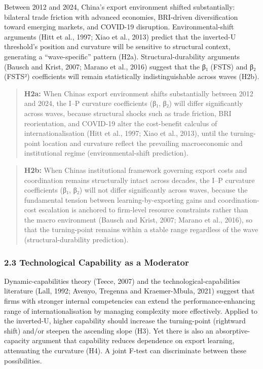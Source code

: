 \documentclass[12pt,a4paper]{article}
\begin{document}
Between 2012 and 2024, China's export environment shifted substantially:
bilateral trade friction with advanced economies, BRI-driven
diversification toward emerging markets, and COVID-19 disruption.
Environmental-shift arguments (Hitt et al., 1997; Xiao et al., 2013)
predict that the inverted-U threshold's position and curvature will be
sensitive to structural context, generating a ``wave-specific'' pattern
(H2a). Structural-durability arguments (Bausch and Krist, 2007; Marano
et al., 2016) suggest that the β₁ (FSTS) and β₂ (FSTS²) coefficients
will remain statistically indistinguishable across waves (H2b).

\begin{quote}
\textbf{H2a:} When China\textquotesingle s export environment shifts
substantially between 2012 and 2024, the I--P curvature coefficients
(β₁, β₂) will differ significantly across waves, because structural
shocks such as trade friction, BRI reorientation, and COVID-19 alter the
cost-benefit calculus of internationalisation (Hitt et al., 1997; Xiao
et al., 2013), until the turning-point location and curvature reflect
the prevailing macroeconomic and institutional regime
(environmental-shift prediction).
\end{quote}

\begin{quote}
\textbf{H2b:} When China\textquotesingle s institutional framework
governing export costs and coordination remains structurally intact
across decades, the I--P curvature coefficients (β₁, β₂) will not differ
significantly across waves, because the fundamental tension between
learning-by-exporting gains and coordination-cost escalation is anchored
to firm-level resource constraints rather than the macro environment
(Bausch and Krist, 2007; Marano et al., 2016), so that the turning-point
remains within a stable range regardless of the wave
(structural-durability prediction).
\end{quote}

\hypertarget{23-technological-capability-as-a-moderator}{%
\subsubsection{2.3 Technological Capability as a
Moderator}\label{23-technological-capability-as-a-moderator}}

Dynamic-capabilities theory (Teece, 2007) and the
technological-capabilities literature (Lall, 1992; Avenyo, Tregenna and
Kraemer-Mbula, 2021) suggest that firms with stronger internal
competencies can extend the performance-enhancing range of
internationalisation by managing complexity more effectively. Applied to
the inverted-U, higher capability should increase the turning-point
(rightward shift) and/or steepen the ascending slope (H3). Yet there is
also an absorptive-capacity argument that capability reduces dependence
on export learning, attenuating the curvature (H4). A joint F-test can
discriminate between these possibilities.
\end{document}
